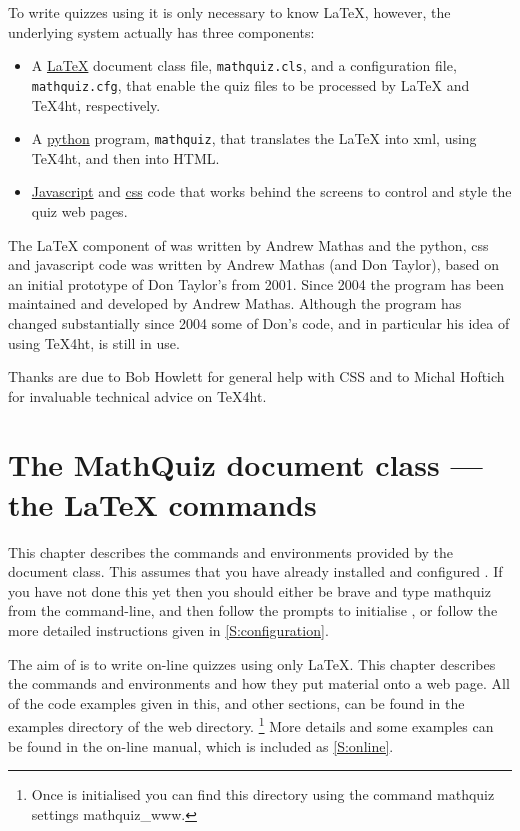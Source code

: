 \documentclass[svgnames]{article}
\newcommand\ddash{\texttt{\textemdash\textemdash}}
\begin{document}
    To write quizzes using \MathQuiz it is only necessary to know
    \LaTeX, however, the underlying \MathQuiz system actually has three components:
    \begin{itemize}
      \item A \href{https://www.latex-project.org/}{\LaTeX} document class file, \texttt{mathquiz.cls}, and
      a  configuration file, \texttt{mathquiz.cfg}, that enable the
      quiz files to be processed by \LaTeX{} and \TeX 4ht, respectively.
      \item A \href{https://www.python.org/}{python} program, \texttt{mathquiz}, that translates the
      \LaTeX{} into xml, using \TeX 4ht, and then into HTML.
      \item \href{https://www.w3schools.com/Js/}{Javascript} and \href{https://www.w3schools.com/css/}{css}
      code that works behind the screens to control and style the quiz web pages.
    \end{itemize}

   The \LaTeX{} component of \MathQuiz{} was written by Andrew Mathas
   and the python, css and javascript code was written by Andrew Mathas
   (and Don Taylor), based on an initial prototype of Don Taylor's from
   2001.  Since 2004 the program has been maintained and developed by
   Andrew Mathas. Although the program has changed substantially since
   2004 some of Don's code, and in particular his idea of using
   \TeX4ht, is still in use.

   Thanks are due to Bob Howlett for general help with CSS and to
   Michal Hoftich for invaluable technical advice on \TeX4ht.

 \section{The MathQuiz document class --- the \LaTeX{} commands}\label{S:documentclass}

  This chapter describes the commands and environments provided by the
  \MathQuiz document class. This assumes that you have already installed
  and configured \MathQuiz. If you have not done this yet then you
  should either be brave and type \textsf{mathquiz} from the
  command-line, and then follow the prompts to initialise \MathQuiz, or
  follow the more detailed instructions given in
  \autoref{S:configuration}.

  The aim of \MathQuiz is to write on-line quizzes using only \LaTeX.
  This chapter describes the \MathQuiz commands and environments and how
  they put material onto a web page.  All of the code examples given in
  this, and other sections, can be found in the \textsf{examples}
  directory of the \MathQuiz web directory.%
  \footnote{Once \MathQuiz is initialised you can find this directory
  using the command \textsf{mathquiz \ddash settings mathquiz\_www}.}
  More details and some examples can be found in the on-line manual,
  which is included as \autoref{S:online}.
\end{document}
